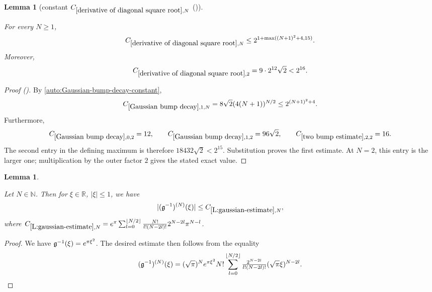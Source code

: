 \documentclass[12pt,reqno]{amsart}
\newcommand{\auto}{{({\tiny\faCar})}}
\theoremstyle{plain}
\newtheorem{lemma}[theorem]{Lemma}
\numberwithin{equation}{section}
\theoremstyle{remark}
\newcommand{\uses}[1]{}
\newcommand{\usesdefs}[1]{}
\newcommand{\leanok}{}
\newcommand{\lean}[1]{}
\newcommand{\R}{{\mathbb R}}
\newcommand{\N}{{\mathbb N}}
\begin{document}
\begin{lemma}[constant $C_{\ref{derivative of diagonal square root},N}$ \auto]\label{constant derivative diagonal square root}\uses{Gaussian bump decay,two bump estimate,derivative of diagonal square root}\usesdefs{}
\lean{Auto.constantDerivativeDiagonalSquareRoot}
\leanok
For every $N\ge1$,
\begin{equation}\label{constant derivative diagonal square root bound}
C_{\ref{derivative of diagonal square root},N}
\le2^{1+\max((N+1)^2+4,15)}.
\end{equation}
Moreover,
\begin{equation}\label{auto:constant-derivative-diagonal-square-root-two}
C_{\ref{derivative of diagonal square root},2}=9\cdot2^{12}\sqrt2<2^{16}.
\end{equation}
\end{lemma}
\begin{proof}[Proof \auto]
By \eqref{auto:Gaussian-bump-decay-constant},
\[
C_{\ref{Gaussian bump decay},1,N}
=8\sqrt2(4(N+1))^{N/2}
\le2^{(N+1)^2+4}.
\]
Furthermore,
\[
C_{\ref{Gaussian bump decay},0,2}=12,
\qquad
C_{\ref{Gaussian bump decay},1,2}=96\sqrt2,
\qquad
C_{\ref{two bump estimate},2,2}=16.
\]
The second entry in the defining maximum is therefore $18432\sqrt2<2^{15}$. Substitution proves the first estimate. At $N=2$, this entry is the larger one; multiplication by the outer factor $2$ gives the stated exact value.
\end{proof}


\begin{lemma}\label{L:gaussian-estimate}\uses{}\usesdefs{gaussian}
\lean{Auto.gaussianEstimate}
\leanok
Let $N\in \N$. Then for $\xi \in \R$, $|\xi|\leq 1$, we have
\begin{equation}\label{auto:inverse-Gaussian-derivative-bound}
|(\mathfrak{g}^{-1})^{(N)}(\xi)| \leq C_{\ref{L:gaussian-estimate},N},
\end{equation}
where $C_{\ref{L:gaussian-estimate},N}=e^{\pi} \sum_{l=0}^{\lfloor N/2 \rfloor} \frac{N!}{l!(N-2l)!} 2^{N-2l} \pi^{N-l}$.
\end{lemma}

\begin{proof}
We have $\mathfrak{g}^{-1}(\xi)=e^{\pi\xi^2}$. The desired estimate then follows from the equality
\[
(\mathfrak{g}^{-1})^{(N)}(\xi)
=(\sqrt{\pi})^{N} e^{\pi  \xi^2} N!\sum_{l=0}^{\lfloor N/2\rfloor} \tfrac{2^{N-2l}}{l!(N -2l)!} (\sqrt{\pi} \xi)^{N-2l}.
\]
\end{proof}
\end{document}
